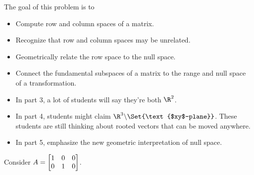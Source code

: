 \documentclass{problemset}
\newcommand{\displayonlynewpage}{\begin{displayonly}\newpage\end{displayonly}}
\newcommand{\bookonlynewpage}{\begin{bookonly}\newpage\end{bookonly}}
\begin{document}
	\displayonlynewpage
	\bookonlynewpage

	\question
	\begin{annotation}
		\begin{goals}

			The goal of this problem is to
			\begin{itemize}
				\item Compute row and column spaces of a matrix.
				\item Recognize that row and column spaces may be unrelated.
				\item Geometrically relate the row space to the null space.
				\item Connect the fundamental subspaces of a matrix to the
					range and null space of a transformation.
			\end{itemize}
		\end{goals}

		\begin{notes}
			\begin{itemize}
				\item In part 3, a lot of students will say they're both $\R^2$.
				\item In part 4, students might claim $\R^3\backslash\Set{\text{$xy$-plane}}$.
					These students are still thinking about rooted vectors that can be moved anywhere.
				\item In part 5, emphasize the new geometric interpretation of null space.
			\end{itemize}
		\end{notes}
	\end{annotation}
	\label{fundamentalSubspaces}
	Consider $A=\mat{1&0&0\\0&1&0}$.
\end{document}
